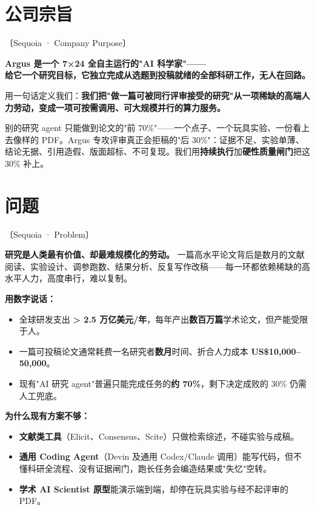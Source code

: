 \documentclass[UTF8,11pt,fontset=none]{ctexart}
\newcommand{\hl}[1]{\textbf{\color{argusnavy}#1}}
\newcommand{\sq}[1]{\hfill{\sffamily\footnotesize\color{argusgray}〔Sequoia · #1〕}}
\begin{document}
\section{公司宗旨}\sq{Company Purpose}

\begin{quotebox}
{\Large\bfseries\color{argusnavy} Argus 是一个 7×24 全自主运行的"AI 科学家"——\\给它一个研究目标，它独立完成从选题到投稿就绪的全部科研工作，无人在回路。}
\end{quotebox}

用一句话定义我们：\hl{我们把"做一篇可被同行评审接受的研究"从一项稀缺的高端人力劳动，变成一项可按需调用、可大规模并行的算力服务。}

别的研究 agent 只能做到论文的"前 70\%"——一个点子、一个玩具实验、一份看上去像样的 PDF。Argus 专攻评审真正会拒稿的"后 30\%"：证据不足、实验单薄、结论无据、引用造假、版面超标、不可复现。我们用\textbf{持续执行}加\textbf{硬性质量闸门}把这 30\% 补上。

\section{问题}\sq{Problem}

\textbf{研究是人类最有价值、却最难规模化的劳动。} 一篇高水平论文背后是数月的文献阅读、实验设计、调参跑数、结果分析、反复写作改稿——每一环都依赖稀缺的高水平人力，高度串行，难以复制。

\begin{keybox}
\textbf{用数字说话：}
\begin{itemize}
  \item 全球研发支出 \hl{> 2.5 万亿美元/年}，每年产出\hl{数百万篇}学术论文，但产能受限于人。
  \item 一篇可投稿论文通常耗费一名研究者\hl{数月}时间、折合人力成本 \hl{US\$10,000–50,000}。
  \item 现有"AI 研究 agent"普遍只能完成任务的\hl{约 70\%}，剩下决定成败的 30\% 仍需人工兜底。
\end{itemize}
\end{keybox}

\textbf{为什么现有方案不够：}
\begin{itemize}
  \item \hl{文献类工具}（Elicit、Consensus、Scite）只做检索综述，不碰实验与成稿。
  \item \hl{通用 Coding Agent}（Devin 及通用 Codex/Claude 调用）能写代码，但不懂科研全流程、没有证据闸门，跑长任务会编造结果或"失忆"空转。
  \item \hl{学术 AI Scientist 原型}能演示端到端，却停在玩具实验与经不起评审的 PDF。
\end{itemize}
\end{document}
